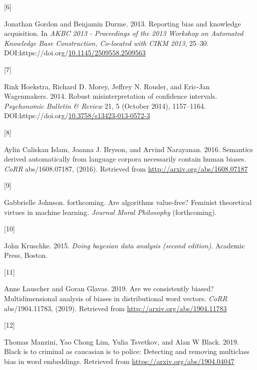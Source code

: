 \documentclass[
  12pt,
  dvipsnames,enabledeprecatedfontcommands]{scrartcl}
\newlength{\cslhangindent}
\newlength{\csllabelwidth}
\newlength{\cslentryspacingunit} %
\newenvironment{CSLReferences}[2] %
 {%
  \setlength{\parindent}{0pt}
  \ifodd #1
  \let\oldpar\par
  \def\par{\hangindent=\cslhangindent\oldpar}
  \fi
  \setlength{\parskip}{#2\cslentryspacingunit}
 }%
 {}
\newcommand{\CSLLeftMargin}[1]{\parbox[t]{\csllabelwidth}{#1}}
\newcommand{\CSLRightInline}[1]{\parbox[t]{\linewidth - \csllabelwidth}{#1}\break}
\begin{document}
\begin{CSLReferences}{0}{0}
\leavevmode{}%
\CSLLeftMargin{{[}6{]} }%
\CSLRightInline{Jonathan Gordon and Benjamin Durme. 2013. Reporting bias
and knowledge acquisition. In \emph{AKBC 2013 - Proceedings of the 2013
Workshop on Automated Knowledge Base Construction, Co-located with CIKM
2013}, 25--30.
DOI:https://doi.org/\href{https://doi.org/10.1145/2509558.2509563}{10.1145/2509558.2509563}}

\leavevmode{}%
\CSLLeftMargin{{[}7{]} }%
\CSLRightInline{Rink Hoekstra, Richard D. Morey, Jeffrey N. Rouder, and
Eric-Jan Wagenmakers. 2014. Robust misinterpretation of confidence
intervals. \emph{Psychonomic Bulletin \& Review} 21, 5 (October 2014),
1157--1164.
DOI:https://doi.org/\href{https://doi.org/10.3758/s13423-013-0572-3}{10.3758/s13423-013-0572-3}}

\leavevmode{}%
\CSLLeftMargin{{[}8{]} }%
\CSLRightInline{Aylin Caliskan Islam, Joanna J. Bryson, and Arvind
Narayanan. 2016. Semantics derived automatically from language corpora
necessarily contain human biases. \emph{CoRR} abs/1608.07187, (2016).
Retrieved from \url{http://arxiv.org/abs/1608.07187}}

\leavevmode{}%
\CSLLeftMargin{{[}9{]} }%
\CSLRightInline{Gabbrielle Johnson. forthcoming. Are algorithms
value-free? Feminist theoretical virtues in machine learning.
\emph{Journal Moral Philosophy} (forthcoming).}

\leavevmode{}%
\CSLLeftMargin{{[}10{]} }%
\CSLRightInline{John Kruschke. 2015. \emph{Doing bayesian data analysis
(second edition)}. Academic Press, Boston.}

\leavevmode{}%
\CSLLeftMargin{{[}11{]} }%
\CSLRightInline{Anne Lauscher and Goran Glavas. 2019. Are we
consistently biased? Multidimensional analysis of biases in
distributional word vectors. \emph{CoRR} abs/1904.11783, (2019).
Retrieved from \url{http://arxiv.org/abs/1904.11783}}

\leavevmode{}%
\CSLLeftMargin{{[}12{]} }%
\CSLRightInline{Thomas Manzini, Yao Chong Lim, Yulia Tsvetkov, and Alan
W Black. 2019. Black is to criminal as caucasian is to police: Detecting
and removing multiclass bias in word embeddings. Retrieved from
\url{https://arxiv.org/abs/1904.04047}}


\end{CSLReferences}
\end{document}
